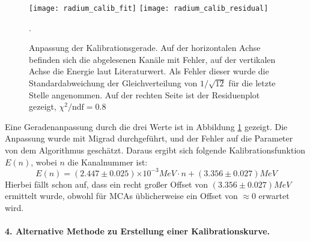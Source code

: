 \documentclass{../Misc/MontavonLaTeX/Montavon}
\newcommand{\e}[1]{\ensuremath{\times 10^{#1}}}
\newcommand{\halfwidth}{0.48\textwidth}
\begin{document}
\begin{figure}[htbp]
\centering
\texttt{[image: radium\_calib\_fit]}
\texttt{[image: radium\_calib\_residual]}
\caption{Anpassung der Kalibrationsgerade. Auf der horizontalen Achse befinden sich die abgelesenen Kanäle mit Fehler, auf der vertikalen Achse die Energie laut Literaturwert. Als Fehler dieser wurde die Standardabweichung der Gleichverteilung von $1 / \sqrt{12}$ für die letzte Stelle angenommen. Auf der rechten Seite ist der Residuenplot gezeigt, $\chi^2 / \textrm{ndf} = 0.8$}.
\label{fig:radium_kalibration}
\end{figure}

Eine Geradenanpassung durch die drei Werte ist in Abbildung \ref{fig:radium_kalibration} gezeigt. Die Anpassung wurde mit Migrad durchgeführt, und der Fehler auf die Parameter von dem Algorithmus geschätzt. Daraus ergibt sich folgende Kalibrationsfunktion $E(n)$, wobei $n$ die Kanalnummer ist:
\[
	E(n) = (2.447 \pm 0.025) \e{-3} \unit{MeV} \cdot n + (3.356 \pm 0.027) \unit{MeV}
\]
Hierbei fällt schon auf, dass ein recht großer Offset von $(3.356 \pm 0.027) \unit{MeV}$ ermittelt wurde, obwohl für MCAs üblicherweise ein Offset von $\approx 0$ erwartet wird. 

\paragraph{4. Alternative Methode zu Erstellung einer Kalibrationskurve.}
\end{document}
